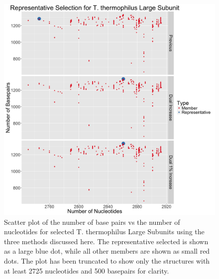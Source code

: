 \begin{figure}
  \includegraphics[width=\linewidth]{chapter-4/figs/tt-lsu-rep}
  \caption{Scatter plot of the number of base pairs vs the number of nucleotides
    for selected T. thermophilus Large Subunits using the three methods
    discussed here. The representative selected is shown as a large blue dot,
    while all other members are shown as small red dots. The plot has been
    truncated to show only the structures with at least 2725 nucleotides and 500
  basepairs for clarity.}
  \label{fig:tt-lsu-rep}
\end{figure}

